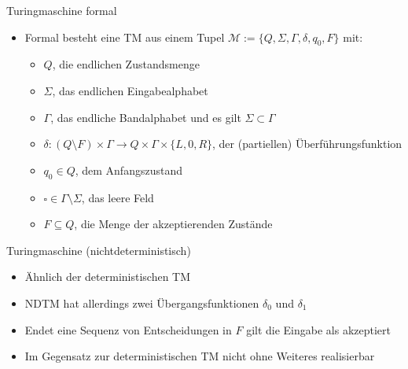 \documentclass[ignorenonframetext,]{beamer}
\begin{document}
\begin{frame}{Turingmaschine formal}

\begin{itemize}
\itemsep1pt\parskip0pt
\item
  Formal besteht eine TM aus einem Tupel
  $\mathcal{M}:=\{ Q, \Sigma, \Gamma, \delta, q_0, F \}$ mit:

  \begin{itemize}
  \itemsep1pt\parskip0pt
  \item
    $Q$, die endlichen Zustandsmenge
  \item
    $\Sigma$, das endlichen Eingabealphabet
  \item
    $\Gamma$, das endliche Bandalphabet und es gilt
    $\Sigma \subset \Gamma$
  \item
    $\delta\colon (Q \setminus F)\times \Gamma \to Q \times \Gamma \times \{L, 0, R\}$,
    der (partiellen) Überführungsfunktion
  \item
    $q_0 \in Q$, dem Anfangszustand
  \item
    $\square \in \Gamma\setminus\Sigma$, das leere Feld
  \item
    $F \subseteq Q$, die Menge der akzeptierenden Zustände
  \end{itemize}
\end{itemize}

\end{frame}

\begin{frame}{Turingmaschine (nichtdeterministisch)}

\begin{itemize}
\itemsep1pt\parskip0pt
\item
  Ähnlich der deterministischen TM
\item
  NDTM hat allerdings zwei Übergangsfunktionen $\delta_0$ und $\delta_1$
\item
  Endet eine Sequenz von Entscheidungen in $F$ gilt die Eingabe als
  akzeptiert
\item
  Im Gegensatz zur deterministischen TM nicht ohne Weiteres realisierbar
\end{itemize}

\end{frame}
\end{document}
